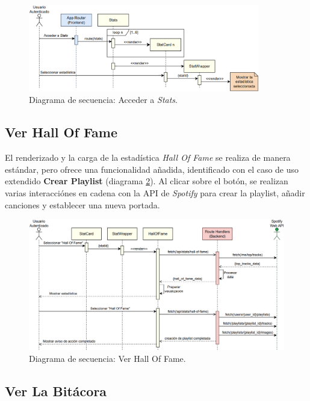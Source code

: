 \begin{figure}[H]
    \centering
    \includegraphics[width=0.9\textwidth]{figures/diagramas_secuencia/ds_acceder_stats.png}
    \caption{Diagrama de secuencia: Acceder a \textit{Stats}.}
    \label{fig:ds_acceder_stats}
\end{figure}

\subsection*{Ver Hall Of Fame}

El renderizado y la carga de la estadística \textit{Hall Of Fame} se realiza de manera estándar, pero ofrece una funcionalidad añadida, identificado con el caso de uso extendido \textbf{Crear Playlist} (diagrama \ref{fig:ds_ver_hall_of_fame}). Al clicar sobre el botón, se realizan varias interacciónes en cadena con la API de \textit{Spotify} para crear la playlist, añadir canciones y establecer una nueva portada.

\begin{figure}[H]
    \centering
    \includegraphics[width=\textwidth]{figures/diagramas_secuencia/ds_ver_hall_of_fame.png}
    \caption{Diagrama de secuencia: Ver Hall Of Fame.}
    \label{fig:ds_ver_hall_of_fame}
\end{figure}

\subsection*{Ver La Bitácora}


